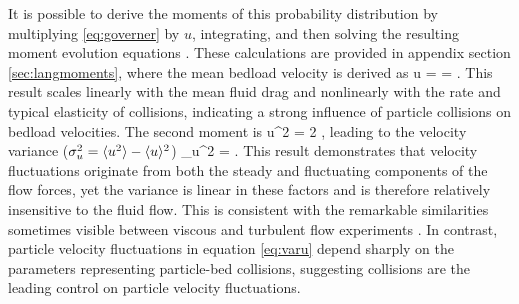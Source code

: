 It is possible to derive the moments of this probability distribution by multiplying \ref{eq:governer} by $u$, integrating, and then solving the resulting moment evolution equations \citep[c.f.][]{Cox1965}.
These calculations are provided in appendix section \ref{sec:langmoments}, where the mean bedload velocity is derived as
\be \langle u \rangle =  = . \label{eq:meanu}\ee
This result scales linearly with the mean fluid drag and nonlinearly with the rate and typical elasticity of collisions, indicating a strong influence of particle collisions on bedload velocities.
The second moment is
\be \langle u^2 \rangle = 2 , \ee
leading to the velocity variance ($\sigma_u^2 = \langle u^2 \rangle - \langle u \rangle ^2 $)
\be \sigma_u^2 = . \label{eq:varu}\ee
This result demonstrates that velocity fluctuations originate from both the steady and fluctuating components of the flow forces, yet the variance is linear in these factors and is therefore relatively insensitive to the fluid flow.
This is consistent with the remarkable similarities sometimes visible between viscous and turbulent flow experiments \citep[e.g.][]{Charru2004,Lajeunesse2010}.
In contrast, particle velocity fluctuations in equation \ref{eq:varu} depend sharply on the parameters representing particle-bed collisions, suggesting collisions are the leading control on particle velocity fluctuations.

